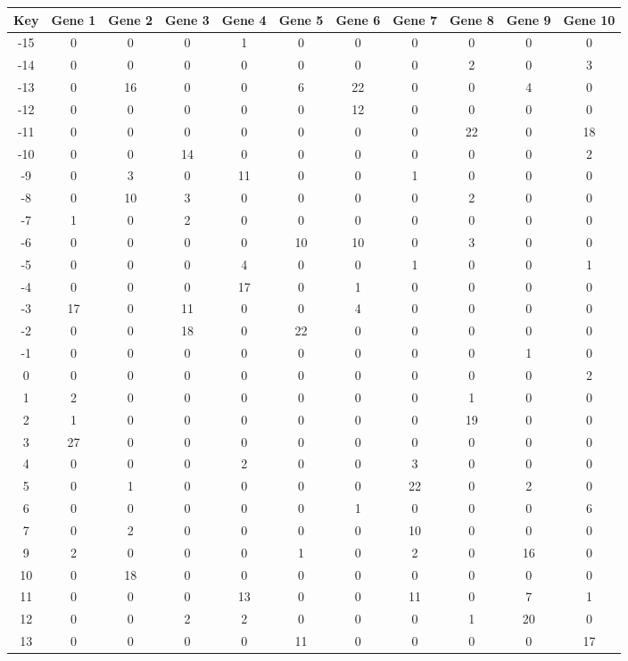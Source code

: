 \begin{tabular}{|c|c|c|c|c|c|c|c|c|c|c|}
\hline
Key & Gene 1 & Gene 2 & Gene 3 & Gene 4 & Gene 5 & Gene 6 & Gene 7 & Gene 8 & Gene 9 & Gene 10 \\
\hline
-15 & 0 & 0 & 0 & 1 & 0 & 0 & 0 & 0 & 0 & 0 \\
-14 & 0 & 0 & 0 & 0 & 0 & 0 & 0 & 2 & 0 & 3 \\
-13 & 0 & 16 & 0 & 0 & 6 & 22 & 0 & 0 & 4 & 0 \\
-12 & 0 & 0 & 0 & 0 & 0 & 12 & 0 & 0 & 0 & 0 \\
-11 & 0 & 0 & 0 & 0 & 0 & 0 & 0 & 22 & 0 & 18 \\
-10 & 0 & 0 & 14 & 0 & 0 & 0 & 0 & 0 & 0 & 2 \\
-9 & 0 & 3 & 0 & 11 & 0 & 0 & 1 & 0 & 0 & 0 \\
-8 & 0 & 10 & 3 & 0 & 0 & 0 & 0 & 2 & 0 & 0 \\
-7 & 1 & 0 & 2 & 0 & 0 & 0 & 0 & 0 & 0 & 0 \\
-6 & 0 & 0 & 0 & 0 & 10 & 10 & 0 & 3 & 0 & 0 \\
-5 & 0 & 0 & 0 & 4 & 0 & 0 & 1 & 0 & 0 & 1 \\
-4 & 0 & 0 & 0 & 17 & 0 & 1 & 0 & 0 & 0 & 0 \\
-3 & 17 & 0 & 11 & 0 & 0 & 4 & 0 & 0 & 0 & 0 \\
-2 & 0 & 0 & 18 & 0 & 22 & 0 & 0 & 0 & 0 & 0 \\
-1 & 0 & 0 & 0 & 0 & 0 & 0 & 0 & 0 & 1 & 0 \\
0 & 0 & 0 & 0 & 0 & 0 & 0 & 0 & 0 & 0 & 2 \\
1 & 2 & 0 & 0 & 0 & 0 & 0 & 0 & 1 & 0 & 0 \\
2 & 1 & 0 & 0 & 0 & 0 & 0 & 0 & 19 & 0 & 0 \\
3 & 27 & 0 & 0 & 0 & 0 & 0 & 0 & 0 & 0 & 0 \\
4 & 0 & 0 & 0 & 2 & 0 & 0 & 3 & 0 & 0 & 0 \\
5 & 0 & 1 & 0 & 0 & 0 & 0 & 22 & 0 & 2 & 0 \\
6 & 0 & 0 & 0 & 0 & 0 & 1 & 0 & 0 & 0 & 6 \\
7 & 0 & 2 & 0 & 0 & 0 & 0 & 10 & 0 & 0 & 0 \\
9 & 2 & 0 & 0 & 0 & 1 & 0 & 2 & 0 & 16 & 0 \\
10 & 0 & 18 & 0 & 0 & 0 & 0 & 0 & 0 & 0 & 0 \\
11 & 0 & 0 & 0 & 13 & 0 & 0 & 11 & 0 & 7 & 1 \\
12 & 0 & 0 & 2 & 2 & 0 & 0 & 0 & 1 & 20 & 0 \\
13 & 0 & 0 & 0 & 0 & 11 & 0 & 0 & 0 & 0 & 17 \\
\hline
\end{tabular}